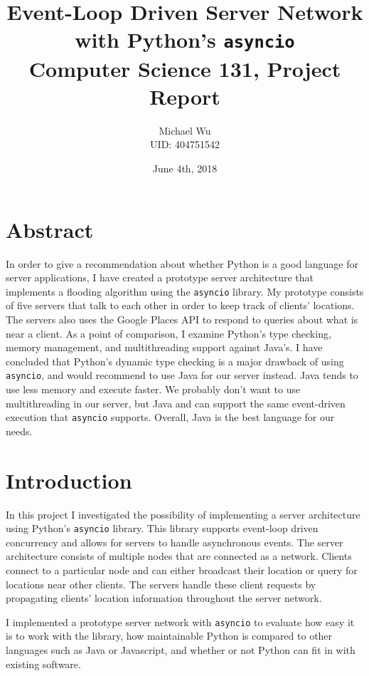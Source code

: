 \documentclass[letterpaper,twocolumn,10pt]{article}
\begin{document}
\title{\Large \bf Event-Loop Driven Server Network with Python's \texttt{asyncio}\\
\normalsize Computer Science 131, Project Report}
\author{Michael Wu\\UID: 404751542}
\date{June 4th, 2018}
\maketitle

\section{Abstract}

In order to give a recommendation about whether Python is a good language for server applications, I have created a prototype server
architecture that implements a flooding algorithm using the \texttt{asyncio} library. My prototype consists of five servers that
talk to each other in order to keep track of clients' locations. The servers also uses the Google Places API to respond to queries about
what is near a client. As a point of comparison, I examine Python's type checking, memory management, and multithreading support against Java's.
I have concluded that Python's dynamic type checking is a major drawback of using \texttt{asyncio}, and would recommend to use Java
for our server instead. Java tends to use less memory and execute faster. We probably don't want to use multithreading in our server,
but Java and can support the same event-driven execution that \texttt{asyncio} supports. Overall, Java is the best language for
our needs.

\section{Introduction}

In this project I investigated the possibility of implementing a server architecture using Python's
\texttt{asyncio} library. This library supports event-loop driven concurrency and allows for servers
to handle asynchronous events. The server architecture consists of multiple nodes that are connected
as a network. Clients connect to a particular node and can either broadcast their location or query for
locations near other clients. The servers handle these client requests by propagating clients' location
information throughout the server network.

I implemented a prototype server network with \texttt{asyncio} to evaluate how easy it is to work with
the library, how maintainable Python is compared to other languages such as Java or Javascript, and whether
or not Python can fit in with existing software.
\end{document}
